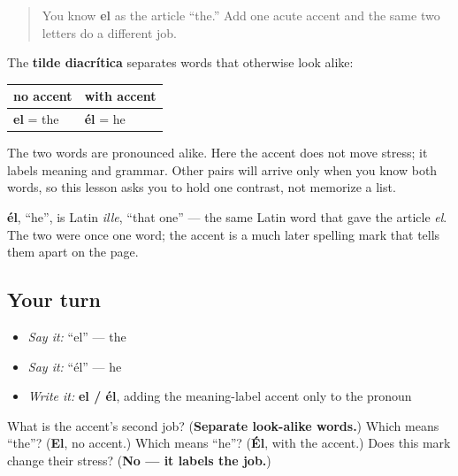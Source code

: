 \label{lesson:ES-W01-tilde-diacritica}



\begin{quote}
You know \textbf{el} as the article “the.” Add one acute accent and the same two letters do a different job.
\end{quote}

\begin{grammarlens}[title={Grammar Lens: one mark, two grammatical jobs}]
The \textbf{tilde diacrítica} separates words that otherwise look alike:

\noindent
\begin{tabularx}{\linewidth}{@{}>{\raggedright\arraybackslash}X>{\raggedright\arraybackslash}X@{}}
\toprule
\textbf{no accent} & \textbf{with accent} \\
\midrule
\textbf{el} = the & \textbf{él} = he \\
\bottomrule
\end{tabularx}

The two words are pronounced alike. Here the accent does not move stress; it labels meaning and grammar. Other pairs will arrive only when you know both words, so this lesson asks you to hold one contrast, not memorize a list.
\end{grammarlens}

\begin{cousinweb}
\textbf{él}, \textquotedblleft{}he\textquotedblright{}, is Latin \emph{ille}, \textquotedblleft{}that one\textquotedblright{} — the same Latin word that gave the article \emph{el}. The two were once one word; the accent is a much later spelling mark that tells them apart on the page.
\end{cousinweb}

\subsection*{Your turn}
\begin{itemize}
\raggedright
  \item \emph{Say it:} “el” — the
  \item \emph{Say it:} “él” — he
  \item \emph{Write it:} \textbf{el / él}, adding the meaning-label accent only to the pronoun
\end{itemize}

\begin{tcolorbox}[breakable,colback=teal!4,colframe=teal!35!black,title={Before you move on}]
What is the accent's second job? (\textbf{Separate look-alike words.}) Which means “the”? (\textbf{El}, no accent.) Which means “he”? (\textbf{Él}, with the accent.) Does this mark change their stress? (\textbf{No — it labels the job.})
\end{tcolorbox}
